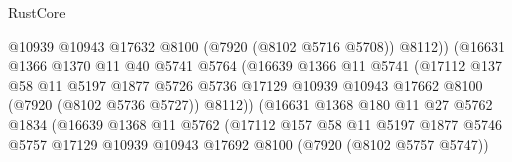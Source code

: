 \begin{lexlean}{RustCore}
\begin{coremodule}
                                      @10939
                                      @10943
                                      @17632
                                      @8100
                                      (@7920 (@8102 @5716 @5708))
                                      @8112))
                                  (@16631
                                    @1366
                                    @1370
                                    @11
                                    @40
                                    @5741
                                    @5764
                                    (@16639
                                      @1366
                                      @11
                                      @5741
                                      (@17112
                                        @137
                                        @58
                                        @11
                                        @5197
                                        @1877
                                        @5726
                                        @5736
                                        @17129
                                        @10939
                                        @10943
                                        @17662
                                        @8100
                                        (@7920 (@8102 @5736 @5727))
                                        @8112))
                                    (@16631
                                      @1368
                                      @180
                                      @11
                                      @27
                                      @5762
                                      @1834
                                      (@16639
                                        @1368
                                        @11
                                        @5762
                                        (@17112
                                          @157
                                          @58
                                          @11
                                          @5197
                                          @1877
                                          @5746
                                          @5757
                                          @17129
                                          @10939
                                          @10943
                                          @17692
                                          @8100
                                          (@7920 (@8102 @5757 @5747))

\end{coremodule}
\end{lexlean}
